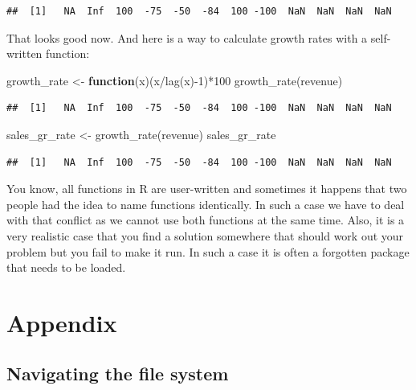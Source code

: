 \documentclass[
  12pt,
  oneside]{book}
\newenvironment{Shaded}{\begin{snugshade}}{\end{snugshade}}
\newcommand{\ControlFlowTok}[1]{\textcolor[rgb]{0.13,0.29,0.53}{\textbf{#1}}}
\newcommand{\DecValTok}[1]{\textcolor[rgb]{0.00,0.00,0.81}{#1}}
\newcommand{\FunctionTok}[1]{\textcolor[rgb]{0.00,0.00,0.00}{#1}}
\newcommand{\NormalTok}[1]{#1}
\newcommand{\OtherTok}[1]{\textcolor[rgb]{0.56,0.35,0.01}{#1}}
\newcommand{\SpecialCharTok}[1]{\textcolor[rgb]{0.00,0.00,0.00}{#1}}
\begin{document}
\begin{verbatim}
##  [1]   NA  Inf  100  -75  -50  -84  100 -100  NaN  NaN  NaN  NaN
\end{verbatim}

That looks good now. And here is a way to calculate growth rates with a self-written function:

\begin{Shaded}
\begin{Highlighting}[]
\NormalTok{growth\_rate }\OtherTok{\textless{}{-}} \ControlFlowTok{function}\NormalTok{(x)(x}\SpecialCharTok{/}\FunctionTok{lag}\NormalTok{(x)}\SpecialCharTok{{-}}\DecValTok{1}\NormalTok{)}\SpecialCharTok{*}\DecValTok{100} 
\FunctionTok{growth\_rate}\NormalTok{(revenue)}
\end{Highlighting}
\end{Shaded}

\begin{verbatim}
##  [1]   NA  Inf  100  -75  -50  -84  100 -100  NaN  NaN  NaN  NaN
\end{verbatim}

\begin{Shaded}
\begin{Highlighting}[]
\NormalTok{sales\_gr\_rate }\OtherTok{\textless{}{-}} \FunctionTok{growth\_rate}\NormalTok{(revenue)}
\NormalTok{sales\_gr\_rate}
\end{Highlighting}
\end{Shaded}

\begin{verbatim}
##  [1]   NA  Inf  100  -75  -50  -84  100 -100  NaN  NaN  NaN  NaN
\end{verbatim}

You know, all functions in R are user-written and sometimes it happens that two people had the idea to name functions identically. In such a case we have to deal with that conflict as we cannot use both functions at the same time. Also, it is a very realistic case that you find a solution somewhere that should work out your problem but you fail to make it run. In such a case it is often a forgotten package that needs to be loaded.

\hypertarget{appendix}{%
\chapter{Appendix}\label{appendix}}

\hypertarget{sec:navigation}{%
\section{Navigating the file system}\label{sec:navigation}}
\end{document}

